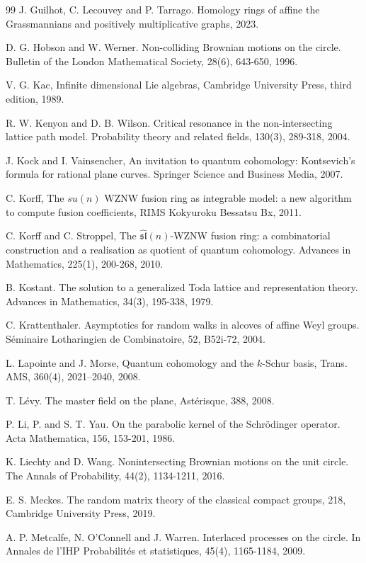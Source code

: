 \documentclass[10pt,11pt]{amsart}%
\begin{document}
\begin{thebibliography}{99}
J. Guilhot, C. Lecouvey and P. Tarrago. Homology rings of affine the Grassmannians and positively multiplicative graphs, 2023.

D. G. Hobson and W. Werner. Non-colliding Brownian motions on the circle. Bulletin of the London Mathematical Society, 28(6), 643-650, 1996.

V. G. Kac, Infinite dimensional Lie algebras, Cambridge
University Press, third edition, 1989.

R. W. Kenyon and D. B. Wilson. Critical resonance in the non-intersecting lattice path model. Probability theory and related fields, 130(3), 289-318, 2004.

J. Kock and I. Vainsencher, An invitation to quantum cohomology: Kontsevich's formula for rational plane curves. Springer Science and Business Media, 2007.

C. Korff, The $su(n)$ WZNW fusion ring as integrable model: a
new algorithm to compute fusion coefficients, RIMS Kokyuroku Bessatsu Bx, 2011.

C. Korff and C. Stroppel, The $\widehat{\mathfrak{sl}%
}(n)$-WZNW fusion ring: a combinatorial construction and a realisation as
quotient of quantum cohomology. Advances in Mathematics, 225(1), 200-268, 2010.

B. Kostant. The solution to a generalized Toda lattice and representation theory. Advances in Mathematics, 34(3), 195-338, 1979.

 C. Krattenthaler. Asymptotics for random walks in alcoves of affine Weyl groups. Séminaire Lotharingien de Combinatoire, 52, B52i-72, 2004.


L. Lapointe and J. Morse, Quantum cohomology and the $k$-Schur basis, Trans. AMS, 360(4), 2021–2040, 2008.


 T. Lévy. The master field on the plane, Astérisque, 388, 2008.

P. Li, P. and S. T. Yau. On the parabolic kernel of the Schrödinger operator. Acta Mathematica, 156, 153-201, 1986.

K. Liechty and D. Wang. Nonintersecting Brownian motions on the unit circle. The Annals of Probability, 44(2), 1134-1211, 2016.


 E. S. Meckes. The random matrix theory of the classical compact groups, 218,  Cambridge University Press, 2019.

 A. P. Metcalfe, N. O’Connell and J. Warren. Interlaced processes on the circle. In Annales de l'IHP Probabilités et statistiques, 45(4), 1165-1184, 2009.


\end{thebibliography}
\end{document}
